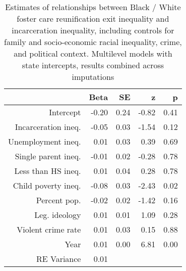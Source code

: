 \begin{table}[ht]
\centering
\caption{Estimates of relationships between Black / White foster care reunification exit inequality and incarceration inequality, including controls for family and socio-economic racial inequality, crime, and political context. Multilevel models with state intercepts, results combined across imputations} 
\begin{tabular}{rrrrr}
  \hline
 & Beta & SE & z & p \\ 
  \hline
Intercept & -0.20 & 0.24 & -0.82 & 0.41 \\ 
  Incarceration ineq. & -0.05 & 0.03 & -1.54 & 0.12 \\ 
  Unemployment ineq. & 0.01 & 0.03 & 0.39 & 0.69 \\ 
  Single parent ineq. & -0.01 & 0.02 & -0.28 & 0.78 \\ 
  Less than HS ineq. & 0.01 & 0.04 & 0.28 & 0.78 \\ 
  Child poverty ineq. & -0.08 & 0.03 & -2.43 & 0.02 \\ 
  Percent pop. & -0.02 & 0.02 & -1.42 & 0.16 \\ 
  Leg. ideology & 0.01 & 0.01 & 1.09 & 0.28 \\ 
  Violent crime rate & 0.01 & 0.03 & 0.15 & 0.88 \\ 
  Year & 0.01 & 0.00 & 6.81 & 0.00 \\ 
  RE Variance & 0.01 &  &  &  \\ 
   \hline
\end{tabular}
\end{table}
